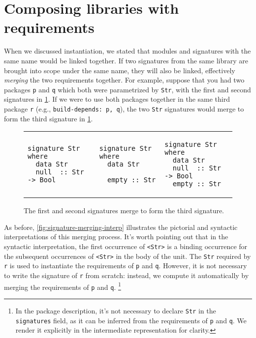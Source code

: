 \section{Composing libraries with requirements}

When we discussed instantiation, we stated that modules and signatures
with the same name would be linked together.  If two signatures from the
same library are brought into scope under the same name, they will also
be linked, effectively \emph{merging} the two requirements together.
For example, suppose that you had two packages \verb|p| and \verb|q|
which both were parametrized by \verb|Str|, with the first and second
signatures in \cref{fig:signature-merging}.  If we were to use
both packages together in the same third package \verb|r| (e.g.,
\verb|build-depends: p, q|), the two \verb|Str| signatures would merge
to form the third signature in \cref{fig:signature-merging}.

\begin{figure}
\begin{tabular}{p{} p{} p{}}
\begin{lstlisting}
signature Str where
  data Str
  null  :: Str -> Bool
\end{lstlisting}
&
\begin{lstlisting}
signature Str where
  data Str

  empty :: Str
\end{lstlisting}
&
\begin{lstlisting}
signature Str where
  data Str
  null  :: Str -> Bool
  empty :: Str
\end{lstlisting}
\end{tabular}
\caption{The first and second signatures merge to form the third signature.}
\label{fig:signature-merging}
\end{figure}

As before, \cref{fig:signature-merging-interp} illustrates the
pictorial and syntactic interpretations of this merging process.  It's
worth pointing out that in the syntactic interpretation, the first
occurrence of \verb|<Str>| is a binding occurrence for the subsequent
occurrences of \verb|<Str>| in the body of the unit.  The
\verb|Str| required by \verb|r| is used to instantiate the requirements
of \verb|p| and \verb|q|. However, it is not necessary to write the
signature of \verb|r| from scratch: instead, we compute it automatically
by merging the requirements of \verb|p| and \verb|q|.%
%
\footnote{In the package description, it's not necessary to declare \texttt{Str}
in the \texttt{signatures} field, as it can be inferred from the requirements
of \texttt{p} and \texttt{q}.  We render it explicitly in the intermediate
representation for clarity.}

